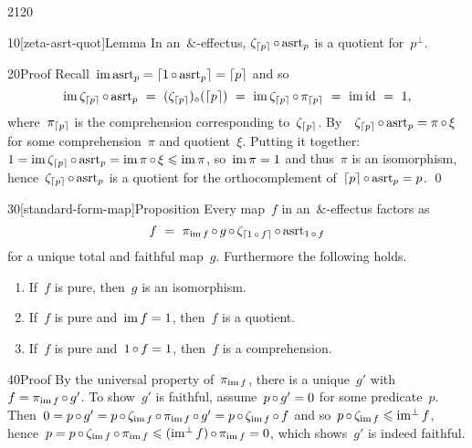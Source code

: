\begin{parsec}{2120}%
\begin{point}{10}[zeta-asrt-quot]{Lemma}%
    In an~$\&$-effectus,
    $\zeta_{\left\lceil p\right\rceil} \mathop{\circ} \mathrm{asrt}_p$
    is a quotient for~$p^\perp$.
\begin{point}{20}{Proof}%
Recall~$\operatorname{im} \mathrm{asrt}_p = \left\lceil1 \mathop{\circ} \mathrm{asrt}_p\right\rceil = \left\lceil p\right\rceil$ and so
\begin{equation*}
\operatorname{im} \zeta_{\left\lceil p\right\rceil} \mathop{\circ} \mathrm{asrt}_p
\ =\  (\zeta_{\left\lceil p\right\rceil})_\diamond( \left\lceil p\right\rceil)
\ =\  \operatorname{im} \zeta_{\left\lceil p\right\rceil} \mathop{\circ} \pi_{\left\lceil p\right\rceil}
\ =\  \operatorname{im} \operatorname{id} \ =\  1,
\end{equation*}
where~$\pi_{\left\lceil p\right\rceil}$ is the comprehension corresponding to~$\zeta_{\left\lceil p\right\rceil}$.
By~~$\zeta_{\left\lceil p\right\rceil} \mathop{\circ} \mathrm{asrt}_p = \pi \mathop{\circ} \xi$
    for some comprehension~$\pi$ and quotient~$\xi$.
Putting it together:
$1 = \operatorname{im} \zeta_{\left\lceil p\right\rceil} \mathop{\circ} \mathrm{asrt}_p = \operatorname{im} \pi \mathop{\circ} \xi \leqslant \operatorname{im} \pi$,
so~$\operatorname{im} \pi = 1$ and thus~$\pi$ is an isomorphism,
hence~$\zeta_{\left\lceil p\right\rceil}\mathop{\circ} \mathrm{asrt}_p$
is a quotient for the orthocomplement of~$\left\lceil p\right\rceil \mathop{\circ} \mathrm{asrt}_p = p$. \qed
\end{point}
\end{point}
\begin{point}{30}[standard-form-map]{Proposition}%
Every map~$f$
in an~$\&$-effectus
factors as
\begin{equation}\label{eq-standard-form-map}
        f \ =\ \pi_{\operatorname{im} f} \mathop{\circ} g \mathop{\circ} \zeta_{\left\lceil1 \mathop{\circ} f\right\rceil} \mathop{\circ} \mathrm{asrt}_{1 \mathop{\circ} f} 
    \end{equation}
    for a unique total and faithful map~$g$.
Furthermore the following holds.
\begin{enumerate}
\item
If~$f$ is pure, then~$g$ is an isomorphism.
\item
If~$f$ is pure and~$\operatorname{im} f = 1$, then~$f$ is a quotient.
\item
If~$f$ is pure and~$1 \mathop{\circ} f = 1$, then~$f$ is a comprehension.
\end{enumerate}
\begin{point}{40}{Proof}%
By the universal property of~$\pi_{\operatorname{im} f}$,
    there is a unique~$g'$ with~$f = \pi_{\operatorname{im} f} \mathop{\circ} g'$.
To show~$g'$ is faithful, assume~$p\mathop{\circ} g' = 0$
    for some predicate~$p$.
Then~$0 = p \mathop{\circ} g' = p \mathop{\circ} \zeta_{\operatorname{im} f} \mathop{\circ} \pi_{\operatorname{im} f} \mathop{\circ} g'
                = p \mathop{\circ} \zeta_{\operatorname{im} f} \mathop{\circ} f$
    and so~$p \mathop{\circ} \zeta_{\operatorname{im} f} \leqslant \operatorname{im^\perp} f$,
    hence~$p = p \mathop{\circ} \zeta_{\operatorname{im} f} \mathop{\circ} \pi_{\operatorname{im} f}
                \leqslant (\operatorname{im^\perp} f )\mathop{\circ} \pi_{\operatorname{im} f} = 0$, which
                shows~$g'$ is indeed faithful.


\end{point}
\end{point}
\end{parsec}
